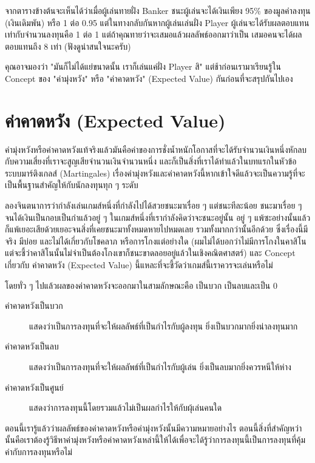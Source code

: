 \documentclass{article}
\begin{document}
จากตารางข้างต้นจะเห็นได้ว่าเมื่อผู้เล่นทายฝั่ง Banker ชนะผู้เล่นจะได้เงินเพียง 95\% ของมูลค่าลงทุน (เงินเดิมพัน) หรือ 1 ต่อ 0.95 แต่ในทางกลับกันหากผู้เล่นเล่นฝั่ง Player ผู้เล่นจะได้รับผลตอบแทนเท่ากับจำนวนลงทุนคือ 1 ต่อ 1 แต่ถ้าคุณทายว่าจะเสมอแล้วผลลัพธ์ออกมาว่าเป็น เสมอคนจะได้ผลตอบแทนถึง 8 เท่า (ฟังดูน่าสนใจนะครับ)

คุณอาจมองว่า "มันก็ไม่ได้แย่ขนาดนั้น เราก็เล่นแค่ฝั่ง Player สิ" แต่ช้าก่อนเรามาเรียนรู้ใน Concept ของ "ค่ามุ่งหวัง" หรือ "ค่าคาดหวัง" (Expected Value) กันก่อนที่จะสรุปกันไปเอง

\newpage
\section{ค่าคาดหวัง (Expected Value)}

ค่ามุ่งหวังหรือค่าคาดหวังแท้จริงแล้วมันคือค่าของการชั่งน้ำหนักโอกาสที่จะได้รับจำนวนเงินหนึ่งหักลบกับความเสี่ยงที่เราจะสูญเสียจำนวนเงินจำนวนหนึ่ง และก็เป็นสิ่งที่เราได้ทำแล้วในบทแรกในหัวข้อระบบมาร์ติงเกลส์ (Martingales) เรื่องค่ามุ่งหวังและค่าคาดหวังนี้หากเข้าใจดีแล้วจะเป็นความรู้ที่จะเป็นพื้นฐานสำคัญให้กับนักลงทุนทุก ๆ ระดับ

ลองจินตนาการว่ากำลังเล่นเกมส์หนึ่งที่กำลังไปได้สวยชนะมาเรื่อย ๆ แต่ชนะทีละน้อย ชนะมาเรื่อย ๆ จนได้เงินเป็นกอบเป็นกำแล้วอยู่ ๆ ในเกมส์หนึ่งที่เรากำลังคิดว่าจะชนะอยู่นั้น อยู่ ๆ แพ้ซะอย่างนั้นแล้วก็แพ้เยอะเสียด้วยเยอะจนสิ่งที่เคยชนะมาทั้งหมดหายไปหมดเลย รวมทั้งมากกว่านั้นอีกด้วย ซึ่งเรื่องนี้มีจริง มีบ่อย และไม่ได้เกี่ยวกับโชคลาภ หรือการโกงแต่อย่างใด (ผมไม่ได้บอกว่าไม่มีการโกงในคาสิโน แต่จะชี้ว่าคาสิโนนั้นไม่จำเป็นต้องโกงเขาก็ชนะขาดลอยอยู่แล้วในเชิงคณิตศาสตร์) และ Concept เกี่ยวกับ ค่าคาดหวัง (Expected Value) นี้แหละที่จะชี้วัดว่าเกมส์นี้เราควรจะเล่นหรือไม่

โดยทั่ว ๆ ไปแล้วผลของค่าคาดหวังจะออกมาในสามลักษณะคือ เป็นบวก เป็นลบและเป็น 0

\begin{description}
\item[ค่าคาดหวังเป็นบวก] แสดงว่าเป็นการลงทุนที่จะให้ผลลัพธ์ที่เป็นกำไรกับผู้ลงทุน ยิ่งเป็นบวกมากยิ่งน่าลงทุนมาก
\item[ค่าคาดหวังเป็นลบ] แสดงว่าเป็นการลงทุนที่จะให้ผลลัพธ์ที่เป็นกำไรกับผู้เล่น ยิ่งเป็นลบมากยิ่งควรหนีให้ห่าง
\item[ค่าคาดหวังเป็นศูนย์]  แสดงว่าการลงทุนนี้โดยรวมแล้วไม่เป็นผลกำไรให้กับผุ้เล่นคนใด
\end{description}

ตอนนี้เรารู้แล้วว่าผลลัพธ์ของค่าคาดหวังหรือค่ามุ่งหวังนั้นมีความหมายอย่างไร ตอนนี้สิ่งที่สำคัญหว่านั้นคือเราต้องรู้วิธีหาค่ามุ่งหวังหรือค่าคาดหวังเหล่านี้ให้ได้เพื่อจะได้รู้ว่าการลงทุนนี้เป็นการลงทุนที่คุ้มค่ากับการลงทุนหรือไม่ 
\end{document}
